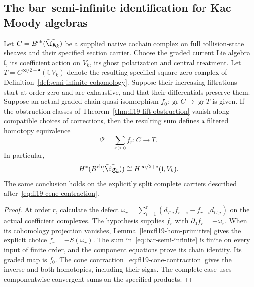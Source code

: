 \subsection{The bar--semi-infinite identification for Kac--Moody algebras}

\begin{theorem}
\label{thm:bar-semi-infinite-km}
Let $C=\bar B^{\mathrm{ch}}(\widehat{\fg}_k)$ be a supplied native cochain complex on full collision-state sheaves and their specified section carrier.
Choose the graded current Lie algebra $\mathfrak l$, its coefficient action on $V_k$, its ghost polarization and central treatment. Let $T=C^{\infty/2+\bullet}(\mathfrak l,V_k)$ denote the resulting specified square-zero complex of Definition~\ref{def:semi-infinite-cohomology}.
Suppose their increasing filtrations start at order zero and are exhaustive, and that their differentials preserve them.
Suppose an actual graded chain quasi-isomorphism $f_0:\operatorname{gr}C\to\operatorname{gr}T$ is given.
If the obstruction classes of Theorem~\ref{thm:fl19-lift-obstruction} vanish along compatible choices of corrections, then the resulting sum defines a filtered homotopy equivalence
\begin{equation}\label{eq:bar-semi-infinite}
\Psi=\sum_{r\ge0}f_r:C\longrightarrow T.
\end{equation}
In particular,
\begin{equation}\label{eq:bar-equals-semi-infinite}
H^*(\bar B^{\mathrm{ch}}(\widehat{\fg}_k))
\cong H^{\infty/2+*}(\mathfrak l,V_k).
\end{equation}
The same conclusion holds on the explicitly split complete carriers described after~\eqref{eq:fl19-cone-contraction}.
\end{theorem}
\begin{proof}
At order $r$, calculate the defect
$\omega_r=\sum_{i=1}^r(d_{T,i}f_{r-i}-f_{r-i}d_{C,i})$ on the actual coefficient complexes.
The hypothesis supplies $f_r$ with $\partial_0 f_r=-\omega_r$.
When its cohomology projection vanishes, Lemma~\ref{lem:fl19-hom-primitive} gives the explicit choice $f_r=-S(\omega_r)$.
The sum in~\eqref{eq:bar-semi-infinite} is finite on every input of finite order, and the component equations prove its chain identity.
Its graded map is $f_0$.
The cone contraction~\eqref{eq:fl19-cone-contraction} gives the inverse and both homotopies, including their signs.
The complete case uses componentwise convergent sums on the specified products.
\end{proof}

